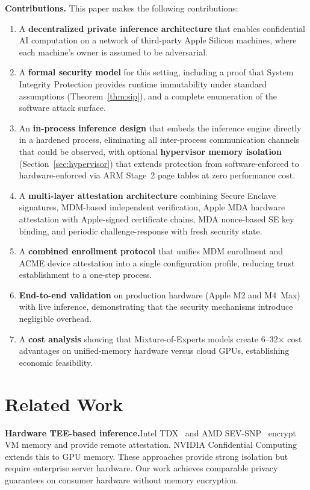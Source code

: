 \documentclass[10pt,twocolumn,letterpaper]{article}
\begin{document}
\textbf{Contributions.} This paper makes the following contributions:
\begin{enumerate}[leftmargin=*,itemsep=2pt,topsep=2pt]
    \item A \textbf{decentralized private inference architecture} that enables confidential AI computation on a network of third-party Apple Silicon machines, where each machine's owner is assumed to be adversarial.
    \item A \textbf{formal security model} for this setting, including a proof that System Integrity Protection provides runtime immutability under standard assumptions (Theorem~\ref{thm:sip}), and a complete enumeration of the software attack surface.
    \item An \textbf{in-process inference design} that embeds the inference engine directly in a hardened process, eliminating all inter-process communication channels that could be observed, with optional \textbf{hypervisor memory isolation} (Section~\ref{sec:hypervisor}) that extends protection from software-enforced to hardware-enforced via ARM Stage~2 page tables at zero performance cost.
    \item A \textbf{multi-layer attestation architecture} combining Secure Enclave signatures, MDM-based independent verification, Apple MDA hardware attestation with Apple-signed certificate chains, MDA nonce-based SE key binding, and periodic challenge-response with fresh security state.
    \item A \textbf{combined enrollment protocol} that unifies MDM enrollment and ACME device attestation into a single configuration profile, reducing trust establishment to a one-step process.
    \item \textbf{End-to-end validation} on production hardware (Apple M2 and M4~Max) with live inference, demonstrating that the security mechanisms introduce negligible overhead.
    \item A \textbf{cost analysis} showing that Mixture-of-Experts models create 6--32$\times$ cost advantages on unified-memory hardware versus cloud GPUs, establishing economic feasibility.
\end{enumerate}

\section{Related Work}
\label{sec:related}

\textbf{Hardware TEE-based inference.}\quad Intel TDX~\cite{intel-tdx} and AMD SEV-SNP~\cite{amd-sev} encrypt VM memory and provide remote attestation. NVIDIA Confidential Computing~\cite{nvidia-cc} extends this to GPU memory. These approaches provide strong isolation but require enterprise server hardware. Our work achieves comparable privacy guarantees on consumer hardware without memory encryption.
\end{document}
